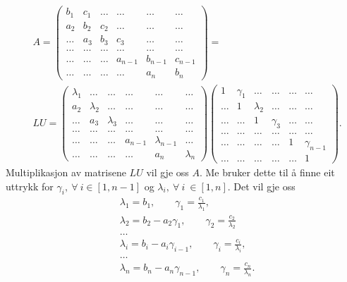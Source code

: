 \documentclass[11pt, a4paper]{article}
\begin{document}
    \begin{equation*}
      \begin{align}
        &A =
        \begin{pmatrix}
          b_1 & c_1 & \dots & \dots & \dots & \dots \\
          a_2 & b_2 & c_2 & \dots & \dots & \dots \\
          \dots & a_3 & b_3 & c_3 & \dots & \dots \\
          \dots & \dots & \dots & \dots & \dots & \dots \\
          \dots & \dots & \dots & a_{n-1} & b_{n-1} & c_{n-1} \\
          \dots & \dots & \dots & \dots & a_n & b_n
        \end{pmatrix} = \\
        &LU =
        \begin{pmatrix}
          \lambda_1 & \dots & \dots & \dots & \dots & \dots \\
          a_2 & \lambda_2 & \dots & \dots & \dots & \dots \\
          \dots & a_3 & \lambda_3 & \dots & \dots & \dots \\
          \dots & \dots & \dots & \dots & \dots & \dots \\
          \dots & \dots & \dots & a_{n-1} & \lambda_{n-1} & \dots \\
          \dots & \dots & \dots & \dots & a_n & \lambda_n 
        \end{pmatrix}
        \begin{pmatrix}
          1 & \gamma_1  & \dots & \dots & \dots & \dots \\
          \dots & 1 & \lambda_2 & \dots & \dots & \dots \\
          \dots & \dots & 1 & \gamma_3 & \dots & \dots \\
          \dots & \dots & \dots & \dots & \dots & \dots \\
          \dots & \dots & \dots & \dots & 1 & \gamma_{n-1} \\
          \dots & \dots & \dots & \dots & \dots & 1 
        \end{pmatrix}.
      \end{align}
    \end{equation*}
    Multiplikasjon av matrisene $LU$ vil gje oss $A$. Me bruker dette til å finne eit uttrykk for 
    $\gamma_i, \ \forall \ i \in [1, n-1]$ og $\lambda_i, \ \forall \ i \ \in [1, n]$. Det vil gje oss
    \begin{equation*}
      \begin{align}
        &\lambda_1 = b_1, \qquad \gamma_1 = \frac{c_1}{\lambda_1}, \\
        &\lambda_2 = b_2 - a_2\gamma_1, \qquad \gamma_2 = \frac{c_2}{\lambda_2} \\ 
        &\dots \\
        &\lambda_i = b_i - a_i\gamma_{i-1}, \qquad \gamma_i = \frac{c_i}{\lambda_{i}}, \\
        &\dots \\
        &\lambda_n = b_n - a_n\gamma_{n-1}, \qquad \gamma_n = \frac{c_n}{\lambda_n}.
      \end{align}
    \end{equation*}
\end{document}
